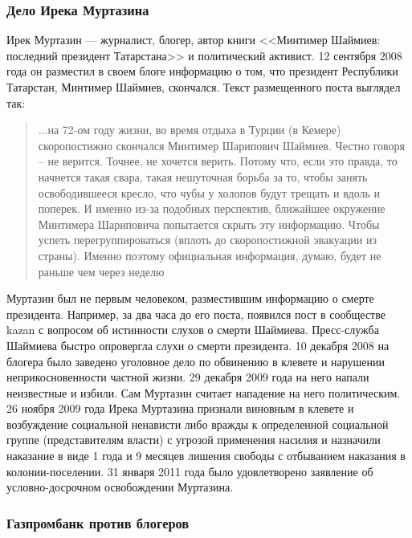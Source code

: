 \subsubsection{Дело Ирека Муртазина}
Ирек Муртазин --- журналист, блогер, автор книги <<Минтимер Шаймиев: последний президент Татарстана>> и политический активист. 12 сентября 2008 года он разместил в своем блоге информацию о том, что президент Республики Татарстан, Минтимер Шаймиев, скончался. Текст размещенного поста выглядел так\cite{murtazin_post}:
\begin{quote}...на 72-ом году жизни, во время отдыха в Турции (в  Кемере) скоропостижно скончался Минтимер Шарипович Шаймиев.
Честно говоря – не верится. Точнее, не хочется верить. Потому что, если это правда, то начнется такая свара, такая нешуточная борьба за то, чтобы занять освободившееся кресло, что чубы у холопов будут трещать и вдоль и поперек. И именно из-за подобных перспектив, ближайшее окружение Минтимера Шариповича попытается скрыть эту информацию. Чтобы успеть перегруппироваться (вплоть до скоропостижной эвакуации из страны). Именно поэтому официальная информация, думаю, будет не раньше чем через неделю\end{quote}
Муртазин был не первым человеком, разместившим информацию о смерте президента. Например, за два часа до его поста, появился пост в сообществе kazan с вопросом об истинности слухов о смерти Шаймиева\cite{murtazin_later}. Пресс-служба Шаймиева быстро опровергла слухи о смерти президента\cite{murtazin_alive}. 10 декабря 2008 на блогера было заведено уголовное дело по обвинению в клевете и нарушении неприкосновенности частной жизни\cite{murtazin_delo}. 29 декабря 2009 года на него напали неизвестные и избили\cite{murtazin_beat}. Сам Муртазин считает нападение на него политическим\cite{murtazin_political}. 26 ноября 2009 года Ирека Муртазина признали виновным в клевете и возбуждение социальной ненависти либо вражды к определенной социальной группе (представителям власти\cite{murtazin_group}) с угрозой применения насилия и назначили наказание в виде 1 года и 9 месяцев лишения свободы с отбыванием наказания в колонии-поселении\cite{murtazin_court}. 31 января 2011 года было удовлетворено заявление об условно-досрочном освобождении Муртазина\cite{murtazin_free}.
\subsubsection{Газпромбанк против блогеров}
